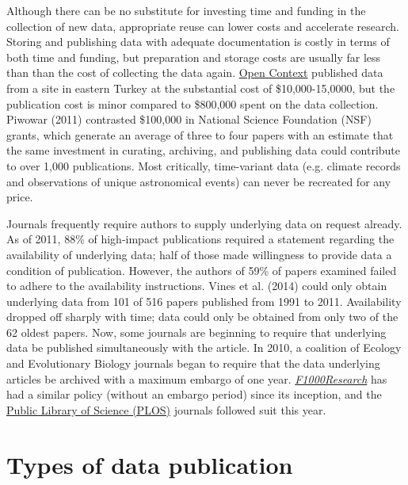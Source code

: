 \documentclass[10pt,twocolumn]{article}
\begin{document}
Although there can be no substitute for investing time and funding in the collection of new data, appropriate reuse can lower costs and accelerate research. 
Storing and publishing data with adequate documentation is costly in terms of both time and funding, but preparation and storage costs are usually far less than than the cost of collecting the data again.
\href{http://opencontext.org/}{Open Context} published data from a site in eastern Turkey at the substantial cost of \$10,000-15,0000, but the publication cost is minor compared to \$800,000 spent on the data collection.\cite{kansa_we_2014}
Piwowar (2011) contrasted \$100,000 in National Science Foundation (NSF) grants, which generate an average of three to four papers with an estimate that the same investment in curating, archiving, and publishing data could contribute to over 1,000 publications.\cite{piwowar_data_2011}
Most critically, time-variant data (e.g. climate records and observations of unique astronomical events) can never be recreated for any price.\cite{gray_online_2002}

Journals frequently require authors to supply underlying data on request already.
As of 2011, 88\% of high-impact publications required a statement regarding the availability of underlying data; half of those made willingness to provide data a condition of publication.\cite{alsheikh-ali_public_2011}
However, the authors of 59\% of papers examined failed to adhere to the availability instructions.
Vines et al. (2014)\cite{vines_availability_2014} could only obtain underlying data from 101 of 516 papers published from 1991 to 2011.
Availability dropped off sharply with time; data could only be obtained from only two of the 62 oldest papers.
Now, some journals are beginning to require that underlying data be published simultaneously with the article.
In 2010, a coalition of Ecology and Evolutionary Biology journals began to require that the data underlying articles be archived with a maximum embargo of one year.\cite{whitlock_data_2010, fairbairn_advent_2010}
\href{http://f1000research.com}{\emph{F1000Research}} has had a similar policy (without an embargo period) since its inception, and the {\href{http://www.plos.org/}{Public Library of Science (PLOS)}} journals followed suit this year.\cite{bloom_data_2014}

\section*{Types of data publication}\label{types-of-data-publication}
\end{document}
